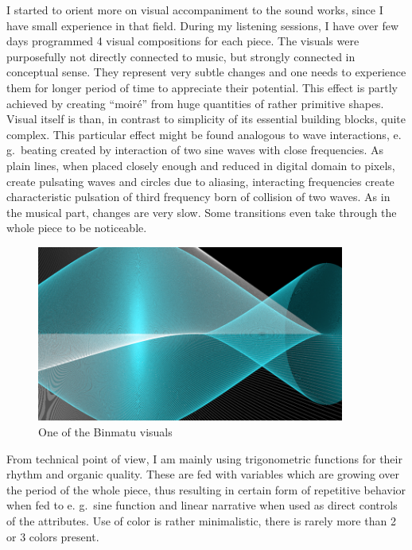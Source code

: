 \documentclass[12pt,a4paper,oneside]{report}
\begin{document}
I started to orient more on visual accompaniment to the sound works, since I have small experience in that field. During my listening sessions, I have over few days programmed 4 visual compositions for each piece. The visuals were purposefully not directly connected to music, but strongly connected in conceptual sense. They represent very subtle changes and one needs to experience them for longer period of time to appreciate their potential. This effect is partly achieved by creating ``moiré'' from huge quantities of rather primitive shapes. Visual itself is than, in contrast to simplicity of its essential building blocks, quite complex. This particular effect might be found analogous to wave interactions, e. g.\ beating created by interaction of two sine waves with close frequencies. As plain lines, when placed closely enough and reduced in digital domain to pixels, create pulsating waves and circles due to aliasing, interacting frequencies create characteristic pulsation of third frequency born of collision of two waves. As in the musical part, changes are very slow. Some transitions even take through the whole piece to be noticeable.

\begin{figure}  
  \centering
    \includegraphics[width=0.9\textwidth]{img/binmatu}
	\caption{One of the Binmatu visuals}
	\label{fig:binmatu}
\end{figure}

From technical point of view, I am mainly using trigonometric functions for their rhythm and organic quality. These are fed with variables which are growing over the period of the whole piece, thus resulting in certain form of repetitive behavior when fed to e. g.\ sine function and linear narrative when used as direct controls of the attributes. Use of color is rather minimalistic, there is rarely more than 2 or 3 colors present.
\end{document}
